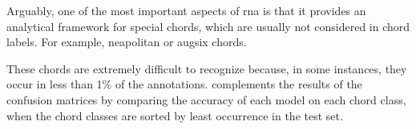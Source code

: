 
Arguably, one of the most important aspects of \gls{rna} is
that it provides an analytical framework for special chords,
which are usually not considered in chord labels. For
example, \gls{neapolitan} or \gls{augsix} chords.

These chords are extremely difficult to recognize because,
in some instances, they occur in less than 1\% of the
annotations.  complements the results of
the confusion matrices by comparing the accuracy of each
model on each chord class, when the chord classes are sorted
by least occurrence in the test set.

